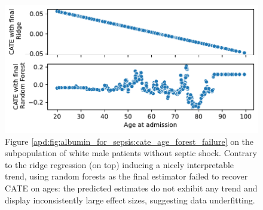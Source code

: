 \documentclass[10pt,letterpaper]{article}
\begin{document}
\begin{figure}
  \centering
  \includegraphics[width=\linewidth]{img_supp/cate_shock_random_forest.pdf}
  \caption{Figure \ref{apd:fig:albumin_for_sepsis:cate_age_forest_failure} on
    the subpopulation of white male patients without septic shock. Contrary to
    the ridge regression (on top) inducing a nicely interpretable trend, using
    random forests as the final estimator failed to recover CATE on ages: the
    predicted estimates do not exhibit any trend and display inconsistently
    large effect sizes, suggesting data underfitting.
  }\label{apd:fig:albumin_for_sepsis:cate_failure}
\end{figure}
\clearpage





\end{document}
